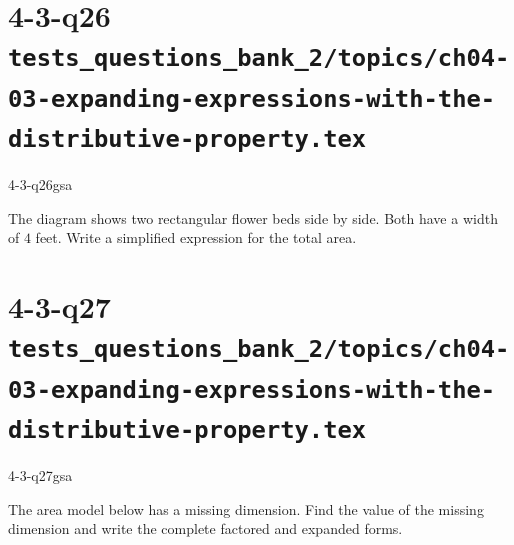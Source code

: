 \documentclass[12pt, fleqn, openany]{studyGuide}
\begin{document}
\newpage
\section*{4-3-q26 \hfill \normalsize\texttt{tests\_questions\_bank\_2/topics/ch04-03-expanding-expressions-with-the-distributive-property.tex}}
\begin{practiceQuestion}{4-3-q26}{gsa}
\begin{questionText}
The diagram shows two rectangular flower beds side by side. Both have a width of $4$ feet. Write a simplified expression for the total area.

\begin{center}
\end{center}
\end{questionText}
\end{practiceQuestion}

\newpage
\section*{4-3-q27 \hfill \normalsize\texttt{tests\_questions\_bank\_2/topics/ch04-03-expanding-expressions-with-the-distributive-property.tex}}
\begin{practiceQuestion}{4-3-q27}{gsa}
\begin{questionText}
The area model below has a missing dimension. Find the value of the missing dimension and write the complete factored and expanded forms.

\begin{center}
\end{center}
\end{questionText}
\end{practiceQuestion}
\end{document}
